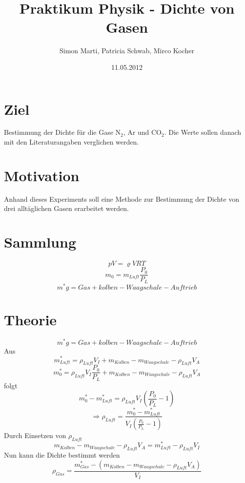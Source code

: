 \documentclass[12pt,a4paper]{article}
\title{Praktikum Physik - Dichte von Gasen}
\author{Simon Marti, Patricia Schwab, Mirco Kocher}
\date{11.05.2012}
\begin{document}
\maketitle

\section*{Ziel}
Bestimmung der Dichte f\"ur die Gase N$_2$, Ar und CO$_2$. Die Werte sollen danach mit den Literaturangaben verglichen werden.

\section*{Motivation}
Anhand dieses Experiments soll eine Methode zur Bestimmung der Dichte von drei allt\"aglichen Gasen erarbeitet werden.

\section*{Sammlung}
\[ p V = \varrho V R T \]
\[ m_0 = m_{Luft} \frac{P_0}{P_L} \]
\[ m^* g = Gas + kolben - Waagschale - Auftrieb \]

\section*{Theorie}
\[ m^* g = Gas + kolben - Waagschale - Auftrieb \]
Aus
\[ m^*_{Luft} = \rho _{Luft} V_I + m_{Kolben} - m_{Waagschale} - \rho_{Luft} V_A \]
\[ m^*_0 = \rho_{Luft} V_I \frac{P_0}{P_L} + m_{Kolben} - m_{Waagschale} - \rho_{Luft} V_A  \]
folgt
\[ m^*_0 - m^*_{Luft} = \rho_{Luft}V_I \left( \frac{P_0}{P_L}-1\right) \]
\[ \Rightarrow \rho_{Luft} = \frac{m^*_0 - m^*_{Luft}}{V_I \left( \frac{P_0}{P_L}-1\right)} \]
Durch Einsetzen von $\rho_{Luft}$
\[ m_{Kolben} - m_{Waagschale} - \rho_{Luft} V_A = m^*_{Luft} - \rho _{Luft} V_I \]
Nun kann die Dichte bestimmt werden
\[ \rho _{Gas} = \frac{m^*_{Gas} - (m_{Kolben} - m_{Waagschale} - \rho_{Luft} V_A)}{V_I} \]
\end{document}
